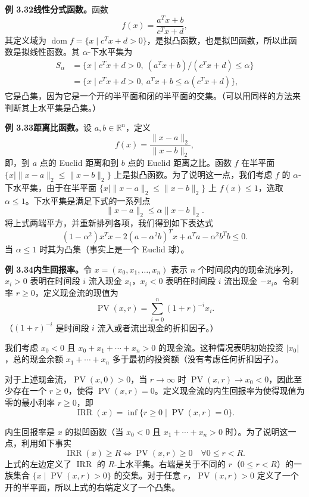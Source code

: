 \documentclass[UTF8, 12pt, fontset=fandol, oneside]{ctexart}
\DeclareMathOperator{\dom}{dom}
\begin{document}
\noindent\textbf{例 3.32\quad 线性分式函数。}\quad 函数
\[
f(x)=\frac{a^Tx+b}{c^Tx+d},
\]
其定义域为 $\dom f=\{x\mid c^Tx+d>0\}$，是拟凸函数，也是拟凹函数，所以此函数是拟线性函数。其 $\alpha$-下水平集为
\[
\begin{aligned}
S_\alpha
&=\{x\mid c^Tx+d>0,\ (a^Tx+b)/(c^Tx+d)\leq\alpha\}\\
&=\{x\mid c^Tx+d>0,\ a^Tx+b\leq\alpha(c^Tx+d)\},
\end{aligned}
\]
它是凸集，因为它是一个开的半平面和闭的半平面的交集。（可以用同样的方法来判断其上水平集是凸集。）

\noindent\textbf{例 3.33\quad 距离比函数。}\quad 设 $a,b\in\mathbb{R}^n$，定义
\[
f(x)=\frac{\|x-a\|_2}{\|x-b\|_2},
\]
即，到 $a$ 点的 Euclid 距离和到 $b$ 点的 Euclid 距离之比。函数 $f$ 在半平面 $\{x\mid \|x-a\|_2\leq\|x-b\|_2\}$ 上是拟凸函数。为了说明这一点，我们考虑 $f$ 的 $\alpha$-下水平集，由于在半平面 $\{x\mid \|x-a\|_2\leq\|x-b\|_2\}$ 上 $f(x)\leq1$，选取 $\alpha\leq1$。下水平集是满足下式的一系列点
\[
\|x-a\|_2\leq\alpha\|x-b\|_2.
\]
将上式两端平方，并重新排列各项，我们得到如下表达式
\[
(1-\alpha^2)x^Tx-2(a-\alpha^2b)^Tx+a^Ta-\alpha^2b^Tb\leq0.
\]
当 $\alpha\leq1$ 时其为凸集（事实上是一个 Euclid 球）。

\noindent\textbf{例 3.34\quad 内生回报率。}\quad 令 $x=(x_0,x_1,\ldots,x_n)$ 表示 $n$ 个时间段内的现金流序列，$x_i>0$ 表明在时间段 $i$ 流入现金 $x_i$，$x_i<0$ 表明在时间段 $i$ 流出现金 $-x_i$。令利率 $r\geq0$，定义现金流的现值为
\[
\operatorname{PV}(x,r)=\sum_{i=0}^n(1+r)^{-i}x_i.
\]
（$(1+r)^{-i}$ 是时间段 $i$ 流入或者流出现金的折扣因子。）

我们考虑 $x_0<0$ 且 $x_0+x_1+\cdots+x_n>0$ 的现金流。这种情况表明初始投资 $|x_0|$，总的现金余额 $x_1+\cdots+x_n$ 多于最初的投资额（没有考虑任何折扣因子）。

对于上述现金流，$\operatorname{PV}(x,0)>0$，当 $r\to\infty$ 时 $\operatorname{PV}(x,r)\to x_0<0$，因此至少存在一个 $r\geq0$，使得 $\operatorname{PV}(x,r)=0$。定义现金流的内生回报率为使得现值为零的最小利率 $r\geq0$，即
\[
\operatorname{IRR}(x)=\inf\{r\geq0\mid \operatorname{PV}(x,r)=0\}.
\]

内生回报率是 $x$ 的拟凹函数（当 $x_0<0$ 且 $x_1+\cdots+x_n>0$ 时）。为了说明这一点，利用如下事实
\[
\operatorname{IRR}(x)\geq R\Longleftrightarrow \operatorname{PV}(x,r)\geq0\quad \forall 0\leq r<R.
\]
上式的左边定义了 $\operatorname{IRR}$ 的 $R$-上水平集。右端是关于不同的 $r$（$0\leq r<R$）的一族集合 $\{x\mid \operatorname{PV}(x,r)>0\}$ 的交集。对于任意 $r$，$\operatorname{PV}(x,r)>0$ 定义了一个开的半平面，所以上式的右端定义了一个凸集。
\end{document}
